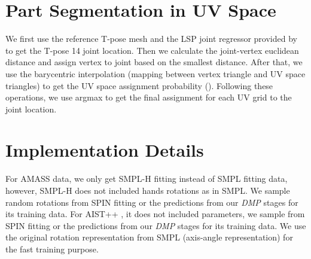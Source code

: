 \documentclass[10pt,twocolumn,letterpaper]{article}
\begin{document}
\section{Part Segmentation in UV Space}

We first use the reference T-pose mesh and the LSP joint regressor provided by \cite{spin,decomr} to get the T-pose 14 joint location. Then we calculate the joint-vertex euclidean distance and assign vertex to joint based on the smallest distance. After that, we use the barycentric interpolation (mapping between vertex triangle and UV space triangles) to get the UV space assignment probability (). Following these operations, we use argmax to get the final assignment for each UV grid to the joint location. 

\section{Implementation Details}

For AMASS \cite{AMASS:ICCV:2019} data, we only get SMPL-H \cite{SMPL-X:2019} fitting instead of SMPL fitting data, however, SMPL-H does not included hands rotations as in SMPL. We sample random rotations from SPIN \cite{spin} fitting or the predictions from our \textit{DMP} stages for its training data. For AIST++ \cite{aist++}, it does not included  parameters, we sample  from SPIN \cite{spin} fitting or the predictions from our \textit{DMP} stages for its training data. We use the original rotation representation from SMPL \cite{smpl} (axis-angle representation) for the fast training purpose. 
\end{document}
